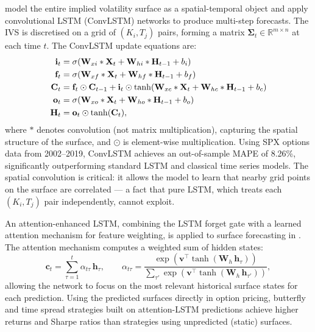 \documentclass[12pt, a4paper]{article}
\begin{document}
\citet{medvedev2022} model the entire implied volatility surface as a
spatial-temporal object and apply convolutional LSTM (ConvLSTM)
networks to produce multi-step forecasts. The IVS is discretised on a
grid of $(K_i, T_j)$ pairs, forming a matrix $\boldsymbol{\Sigma}_t
\in \mathbb{R}^{m \times n}$ at each time $t$. The ConvLSTM update
equations are:
\begin{align}
  \mathbf{i}_t &= \sigma(\mathbf{W}_{xi} * \mathbf{X}_t
    + \mathbf{W}_{hi} * \mathbf{H}_{t-1} + b_i) \notag\\
  \mathbf{f}_t &= \sigma(\mathbf{W}_{xf} * \mathbf{X}_t
    + \mathbf{W}_{hf} * \mathbf{H}_{t-1} + b_f) \notag\\
  \mathbf{C}_t &= \mathbf{f}_t \odot \mathbf{C}_{t-1}
    + \mathbf{i}_t \odot \tanh(\mathbf{W}_{xc} * \mathbf{X}_t
    + \mathbf{W}_{hc} * \mathbf{H}_{t-1} + b_c)
    \label{eq:convlstm}\\
  \mathbf{o}_t &= \sigma(\mathbf{W}_{xo} * \mathbf{X}_t
    + \mathbf{W}_{ho} * \mathbf{H}_{t-1} + b_o) \notag\\
  \mathbf{H}_t &= \mathbf{o}_t \odot \tanh(\mathbf{C}_t), \notag
\end{align}
where $*$ denotes convolution (not matrix multiplication), capturing
the spatial structure of the surface, and $\odot$ is element-wise
multiplication. Using SPX options data from 2002--2019, ConvLSTM
achieves an out-of-sample MAPE of 8.26\%, significantly outperforming
standard LSTM and classical time series models. The spatial convolution
is critical: it allows the model to learn that nearby grid points on the
surface are correlated --- a fact that pure LSTM, which treats each
$(K_i, T_j)$ pair independently, cannot exploit.

An attention-enhanced LSTM, combining the LSTM forget gate with a
learned attention mechanism for feature weighting, is applied to
surface forecasting in \citet{lstmattn2019}. The attention mechanism
computes a weighted sum of hidden states:
\begin{equation}
  \mathbf{c}_t = \sum_{\tau=1}^{t} \alpha_{t\tau}\,\mathbf{h}_\tau,
  \qquad
  \alpha_{t\tau} = \frac{\exp(\mathbf{v}^\top \tanh(\mathbf{W}_h\,\mathbf{h}_\tau))}
  {\sum_{\tau'} \exp(\mathbf{v}^\top \tanh(\mathbf{W}_h\,\mathbf{h}_{\tau'}))},
  \label{eq:attention}
\end{equation}
allowing the network to focus on the most relevant historical surface
states for each prediction. Using the predicted surfaces directly in
option pricing, butterfly and time spread strategies built on
attention-LSTM predictions achieve higher returns and Sharpe ratios than
strategies using unpredicted (static) surfaces.
\end{document}
